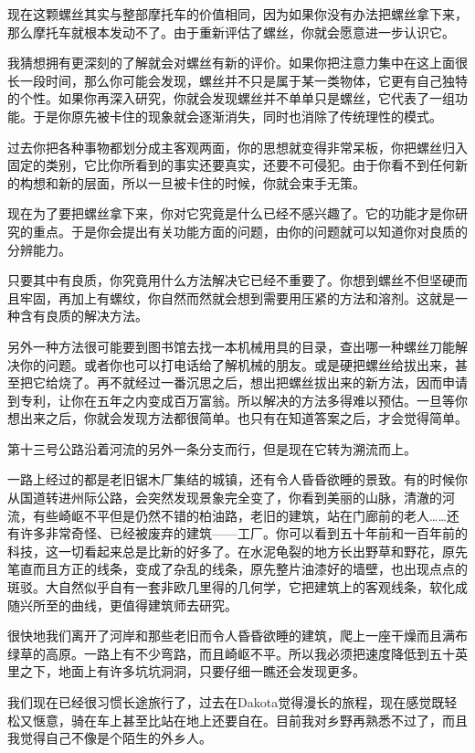 \documentclass[UTF8]{article}
\begin{document}
\par 现在这颗螺丝其实与整部摩托车的价值相同，因为如果你没有办法把螺丝拿下来，那么摩托车就根本发动不了。由于重新评估了螺丝，你就会愿意进一步认识它。
\par 我猜想拥有更深刻的了解就会对螺丝有新的评价。如果你把注意力集中在这上面很长一段时间，那么你可能会发现，螺丝并不只是属于某一类物体，它更有自己独特的个性。如果你再深入研究，你就会发现螺丝并不单单只是螺丝，它代表了一组功能。于是你原先被卡住的现象就会逐渐消失，同时也消除了传统理性的模式。
\par 过去你把各种事物都划分成主客观两面，你的思想就变得非常呆板，你把螺丝归入固定的类别，它比你所看到的事实还要真实，还要不可侵犯。由于你看不到任何新的构想和新的层面，所以一旦被卡住的时候，你就会束手无策。
\par 现在为了要把螺丝拿下来，你对它究竟是什么已经不感兴趣了。它的功能才是你研究的重点。于是你会提出有关功能方面的问题，由你的问题就可以知道你对良质的分辨能力。
\par 只要其中有良质，你究竟用什么方法解决它已经不重要了。你想到螺丝不但坚硬而且牢固，再加上有螺纹，你自然而然就会想到需要用压紧的方法和溶剂。这就是一种含有良质的解决方法。
\par 另外一种方法很可能要到图书馆去找一本机械用具的目录，查出哪一种螺丝刀能解决你的问题。或者你也可以打电话给了解机械的朋友。或是硬把螺丝给拔出来，甚至把它给烧了。再不就经过一番沉思之后，想出把螺丝拔出来的新方法，因而申请到专利，让你在五年之内变成百万富翁。所以解决的方法多得难以预估。一旦等你想出来之后，你就会发现方法都很简单。也只有在知道答案之后，才会觉得简单。
\par 第十三号公路沿着河流的另外一条分支而行，但是现在它转为溯流而上。
\par 一路上经过的都是老旧锯木厂集结的城镇，还有令人昏昏欲睡的景致。有的时候你从国道转进州际公路，会突然发现景象完全变了，你看到美丽的山脉，清澈的河流，有些崎岖不平但是仍然不错的柏油路，老旧的建筑，站在门廊前的老人……还有许多非常奇怪、已经被废弃的建筑——工厂。你可以看到五十年前和一百年前的科技，这一切看起来总是比新的好多了。在水泥龟裂的地方长出野草和野花，原先笔直而且方正的线条，变成了杂乱的线条，原先整片油漆好的墙壁，也出现点点的斑驳。大自然似乎自有一套非欧几里得的几何学，它把建筑上的客观线条，软化成随兴所至的曲线，更值得建筑师去研究。
\par 很快地我们离开了河岸和那些老旧而令人昏昏欲睡的建筑，爬上一座干燥而且满布绿草的高原。一路上有不少弯路，而且崎岖不平。所以我必须把速度降低到五十英里之下，地面上有许多坑坑洞洞，只要仔细一瞧还会发现更多。
\par 我们现在已经很习惯长途旅行了，过去在Dakota觉得漫长的旅程，现在感觉既轻松又惬意，骑在车上甚至比站在地上还要自在。目前我对乡野再熟悉不过了，而且我觉得自己不像是个陌生的外乡人。
\end{document}
